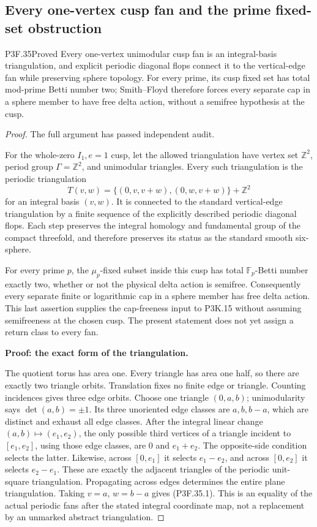 \subsection{Every one-vertex cusp fan and the prime fixed-set obstruction}
\begin{statement}{P3F.35}{Proved}
Every one-vertex unimodular cusp fan is an integral-basis triangulation, and explicit periodic diagonal flops connect it to the vertical-edge fan while preserving sphere topology. For every prime, its cusp fixed set has total mod-prime Betti number two; Smith--Floyd therefore forces every separate cap in a sphere member to have free delta action, without a semifree hypothesis at the cusp.
\end{statement}
\begin{proof}
The full argument has passed independent audit.

For the whole-zero \(I_1,e=1\) cusp, let the allowed triangulation have vertex set \(\mathbb Z^2\), period group \(\Gamma=\mathbb Z^2\), and unimodular triangles. Every such triangulation is the periodic triangulation \[
 T(v,w)=\{(0,v,v+w),(0,w,v+w)\}+\mathbb Z^2                 \tag{P3F.35.1}
\] for an integral basis \((v,w)\). It is connected to the standard vertical-edge triangulation by a finite sequence of the explicitly described periodic diagonal flops. Each step preserves the integral homology and fundamental group of the compact threefold, and therefore preserves its status as the standard smooth six-sphere.

For every prime \(p\), the \(\mu_p\)-fixed subset inside this cusp has total \(\mathbb F_p\)-Betti number exactly two, whether or not the physical delta action is semifree. Consequently every separate finite or logarithmic cap in a sphere member has free delta action. This last assertion supplies the cap-freeness input to P3K.15 without assuming semifreeness at the chosen cusp. The present statement does not yet assign a return class to every fan.

\textbf{Proof: the exact form of the triangulation.}

The quotient torus has area one. Every triangle has area one half, so there are exactly two triangle orbits. Translation fixes no finite edge or triangle. Counting incidences gives three edge orbits. Choose one triangle \((0,a,b)\); unimodularity says \(\det(a,b)=\pm1\). Its three unoriented edge classes are \(a,b,b-a\), which are distinct and exhaust all edge classes. After the integral linear change \((a,b)\mapsto(e_1,e_2)\), the only possible third vertices of a triangle incident to \([e_1,e_2]\), using those edge classes, are \(0\) and \(e_1+e_2\). The opposite-side condition selects the latter. Likewise, across \([0,e_1]\) it selects \(e_1-e_2\), and across \([0,e_2]\) it selects \(e_2-e_1\). These are exactly the adjacent triangles of the periodic unit-square triangulation. Propagating across edges determines the entire plane triangulation. Taking \(v=a\), \(w=b-a\) gives (P3F.35.1). This is an equality of the actual periodic fans after the stated integral coordinate map, not a replacement by an unmarked abstract triangulation.


\end{proof}

